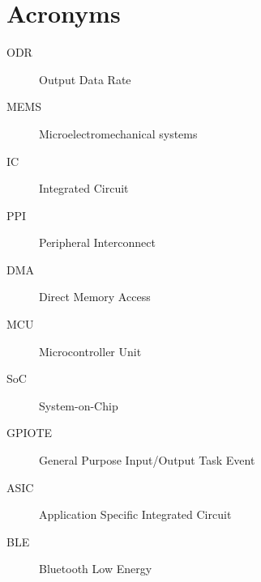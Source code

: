 
\chapter{Acronyms}
\begin{description}
\item[ODR] Output Data Rate
\item[MEMS] Microelectromechanical systems
\item[IC] Integrated Circuit
\item[PPI] Peripheral Interconnect
\item[DMA] Direct Memory Access
\item[MCU] Microcontroller Unit
\item[SoC] System-on-Chip
\item[GPIOTE] General Purpose Input/Output Task Event
\item[ASIC] Application Specific Integrated Circuit
\item[BLE] Bluetooth Low Energy
\end{description}